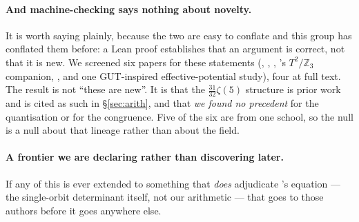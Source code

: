 \documentclass[11pt,a4paper]{article}
\newcommand{\ZZ}{\mathbb{Z}}
\begin{document}
\paragraph{And machine-checking says nothing about novelty.} It is worth saying plainly, because
the two are easy to conflate and this group has conflated them before: a Lean proof establishes
that an argument is correct, not that it is new. We screened six papers for these statements
(\cite{HHHK03}, \cite{HY04}, \cite{HNT}, \cite{KTY17}'s $T^2/\ZZ_3$ companion, \cite{TZ4}, and one
GUT-inspired effective-potential study), four at full text. The result is not ``these are new''. It
is that the $\tfrac{31}{32}\zeta(5)$ structure is prior work and is cited as such in
\S\ref{sec:arith}, and that \emph{we found no precedent} for the quantisation or for the
congruence. Five of the six are from one school, so the null is a null about that lineage rather
than about the field.

\paragraph{A frontier we are declaring rather than discovering later.} If any of this is ever
extended to something that \emph{does} adjudicate \cite{KM25}'s equation --- the single-orbit
determinant itself, not our arithmetic --- that goes to those authors before it goes anywhere else.
\end{document}
